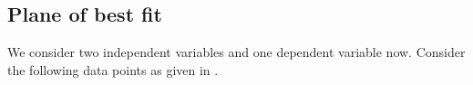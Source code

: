 \documentclass[a4paper, 12pt]{article}
\numberwithin{equation}{section}
\numberwithin{figure}{section}
\theoremstyle{definition}
\newcommand{\WEEK}[1]{%
\hfill Week #1

\vspace{-1em}

\begin{center}
	\rule{\textwidth}{2pt}
\end{center}
\vspace{0.5em}%
}
\begin{document}



\setcounter{section}{2}
\setcounter{subsection}{3}

\subsection{Plane of best fit}

We consider two independent variables and one dependent variable now. Consider
the following data points as given in .
\end{document}

